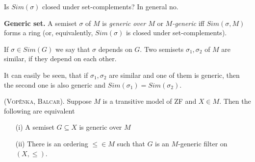 Is $Sim(\sigma)$ closed under set-complements? In general no.

\begin{definition}\label{generic-set}{\bf Generic set.}
A semiset $\sigma$ of $M$ is \emph{generic over $M$} or \emph{$M$-generic} iff $Sim(\sigma,M)$ forms a ring (or, equivalently, $Sim(\sigma)$ is closed under set-complements).
\end{definition}

\begin{definition}
If $\sigma\in Sim(G)$ we say that $\sigma$ depends on $G$. Two semisets $\sigma_1,\sigma_2$ of $M$ are similar, if they depend on each other.
\end{definition}

It can easily be seen, that if $\sigma_1,\sigma_2$ are similar and one of them is generic, then the second one is also generic and $Sim(\sigma_1)=Sim(\sigma_2)$.

\begin{theorem}\label{vopenka-balcar}{\scshape {(Vop\v enka, Balcar).}}
Suppose $M$ is a transitive model of ZF and $X\in M$. Then the following are equivalent
\begin{itemize}
\item[(i)] A semiset $G\subseteq X$ is generic over $M$
\item[(ii)] There is an ordering $\leq\in M$ such that $G$ is an $M$-generic filter on $(X,\leq)$.
\end{itemize}
\end{theorem}

